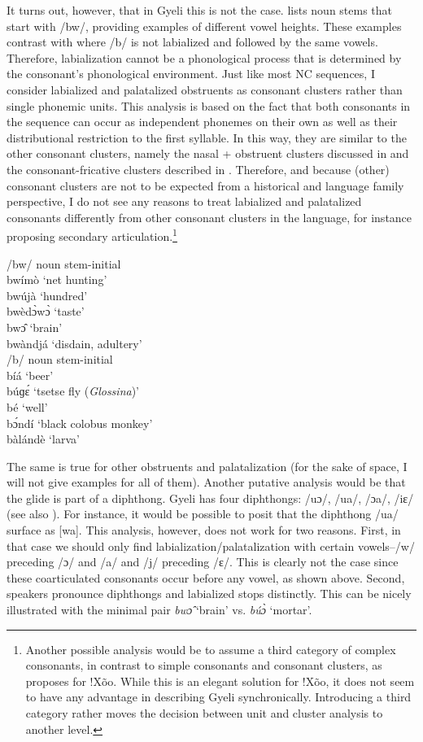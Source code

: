  It turns out, however, that in Gyeli this is not the case.  lists noun stems that start with /bw/, providing examples of different vowel heights. These examples contrast with  where /b/ is not labialized and followed by the same vowels. Therefore, labialization cannot be a phonological process that is determined by the consonant's phonological environment. Just like most NC sequences, I consider labialized and palatalized obstruents as consonant clusters rather than single phonemic units. This analysis is based on the fact that both consonants in the sequence can occur as independent phonemes on their own as well as their distributional restriction to the first syllable. In this way, they are similar to the other consonant clusters, namely the nasal + obstruent clusters discussed in  and the consonant-fricative clusters described in . Therefore, and because (other) consonant clusters are not to be expected from a historical and language family perspective, I do not see any reasons to treat labialized and palatalized consonants differently from other consonant clusters in the language, for instance proposing secondary articulation.\footnote{Another possible analysis would be to assume a third category of complex consonants, in contrast to simple consonants and consonant clusters, as \citet{guldemann2001} proposes for !Xõo. While this is an elegant solution for !Xõo, it does not seem to have any advantage in describing Gyeli synchronically. Introducing a third category rather moves the decision between unit and cluster analysis to another level.}


\ea\label{bwn} /bw/ noun stem-initial \\
 bwímò `net hunting'\\
bwújà `hundred'\\
bwèdɔ̀wɔ̀ `taste'\\
bwɔ̂ `brain'\\
bwàndjá `disdain, adultery'\\
\ex\label{bn} /b/ noun stem-initial \\
 bíá `beer'\\
 búɡɛ́ `tsetse fly ({\itshape Glossina})'\\
bé `well' \\
bɔ́ndí `black colobus monkey'\\
bàlándè `larva'
\z


The same is true for other obstruents and palatalization (for the sake of space,  I will not give examples for all of them). Another putative analysis would be that the glide is part of a diphthong.  Gyeli has four diphthongs: /uɔ/, /ua/, /ɔa/, /iɛ/ (see also ). For instance, it would be possible to posit that the diphthong /ua/ surface as [wa]. This analysis, however, does not work for two reasons. First, in that case we should only find labialization/palatalization with certain vowels--/w/ preceding /ɔ/ and /a/ and /j/ preceding /ɛ/. This is clearly not the case since these coarticulated consonants occur before any vowel, as shown above. Second, speakers pronounce diphthongs and labialized stops distinctly. This can be nicely illustrated with the minimal pair {\itshape bwɔ̂} `brain' vs. {\itshape búɔ̀} `mortar'.  


